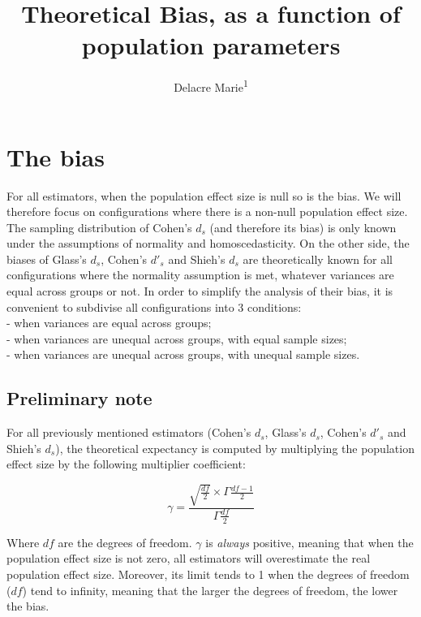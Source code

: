 \documentclass[
  man]{apa6}
\affiliation{
\vspace{0.5cm}
\textsuperscript{1} ULB}
\title{Theoretical Bias, as a function of population parameters}
\author{Delacre Marie\textsuperscript{1}}
\date{}
\begin{document}
\maketitle

\hypertarget{the-bias}{%
\section{The bias}\label{the-bias}}

For all estimators, when the population effect size is null so is the bias. We will therefore focus on configurations where there is a non-null population effect size. The sampling distribution of Cohen's \(d_s\) (and therefore its bias) is only known under the assumptions of normality and homoscedasticity. On the other side, the biases of Glass's \(d_s\), Cohen's \(d'_s\) and Shieh's \(d_s\) are theoretically known for all configurations where the normality assumption is met, whatever variances are equal across groups or not. In order to simplify the analysis of their bias, it is convenient to subdivise all configurations into 3 conditions:\\
- when variances are equal across groups;\\
- when variances are unequal across groups, with equal sample sizes;\\
- when variances are unequal across groups, with unequal sample sizes.

\hypertarget{preliminary-note}{%
\subsection{Preliminary note}\label{preliminary-note}}

For all previously mentioned estimators (Cohen's \(d_s\), Glass's \(d_s\), Cohen's \(d'_s\) and Shieh's \(d_s\)), the theoretical expectancy is computed by multiplying the population effect size by the following multiplier coefficient:

\begin{equation} 
\gamma=\frac{\sqrt{\frac{df}{2}} \times \Gamma{\frac{df-1}{2}}}{\Gamma{\frac{df}{2}}}
\label{eq:mc}
\end{equation}

Where \(df\) are the degrees of freedom. \(\gamma\) is \emph{always} positive, meaning that when the population effect size is not zero, all estimators will overestimate the real population effect size. Moreover, its limit tends to 1 when the degrees of freedom (\(df\)) tend to infinity, meaning that the larger the degrees of freedom, the lower the bias.
\end{document}
